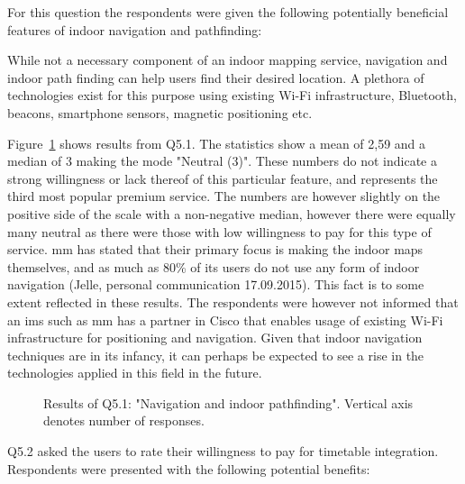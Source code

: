 For this question the respondents were given the following potentially beneficial features of indoor navigation and pathfinding:

\begin{displayquote}
While not a necessary component of an indoor mapping service, navigation and indoor path finding can help users find their desired location. A plethora of technologies exist for this purpose using existing Wi-Fi infrastructure, Bluetooth, beacons, smartphone sensors, magnetic positioning etc.
\end{displayquote}

Figure~\ref{fig:q51} shows results from Q5.1. The statistics show a mean of 2,59 and a median of 3 making the mode "Neutral (3)". These numbers do not indicate a strong willingness or lack thereof of this particular feature, and represents the third most popular premium service. The numbers are however slightly on the positive side of the scale with a non-negative median, however there were equally many neutral as there were those with low willingness to pay for this type of service. \gls{mm} has stated that their primary focus is making the indoor maps themselves, and as much as 80\% of its users do not use any form of indoor navigation (Jelle, personal communication 17.09.2015). This fact is to some extent reflected in these results. The respondents were however not informed that an \gls{ims} such as \gls{mm} has a partner in Cisco that enables usage of existing Wi-Fi infrastructure for positioning and navigation. Given that indoor navigation techniques are in its infancy, it can perhaps be expected to see a rise in the technologies applied in this field in the future. 

\begin{figure}[H]
    \centering
    \caption{Results of Q5.1: "Navigation and indoor pathfinding". Vertical axis denotes number of responses.}
    \label{fig:q51}
\end{figure}

Q5.2 asked the users to rate their willingness to pay for timetable integration. Respondents were presented with the following potential benefits:

